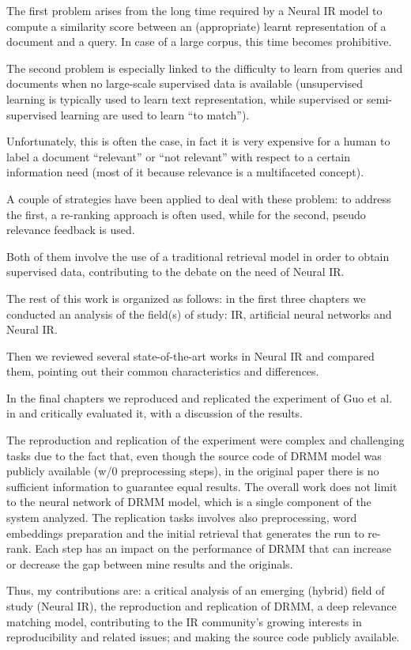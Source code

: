 The first problem arises from the long time required by a Neural IR model to compute a similarity score between an (appropriate) learnt
representation of a document and a query. In case of a large corpus, this time becomes prohibitive.

The second problem is especially linked to the difficulty to learn from queries and documents when no large-scale supervised data is available
(unsupervised learning is typically used to learn text representation, while supervised or semi-supervised learning are used to learn ``to match'').

Unfortunately, this is often the case, in fact it is very expensive for a human to label a document ``relevant'' or ``not relevant''
with respect to a certain information need (most of it because relevance is a multifaceted concept).

A couple of strategies have been applied to deal with these problem: to address the first, a re-ranking approach is often used, while for the second, pseudo relevance feedback is used.

Both of them involve the use of a traditional retrieval model in order to obtain supervised data, contributing to the debate on the need of Neural IR.

The rest of this work is organized as follows: in the first three chapters we conducted an analysis of the field(s) of study: IR, artificial neural networks and Neural IR.

Then we reviewed several state-of-the-art works in Neural IR and compared them, pointing out their common characteristics and differences.

In the final chapters we reproduced and replicated the experiment of Guo et al. in \cite{drmm} and critically evaluated it, with a discussion of the results.

The reproduction and replication of the experiment were complex and challenging tasks due to the fact that, even though the source code of DRMM model was publicly available (w/0 preprocessing steps), in the original paper there is no sufficient information to guarantee equal results. The overall work does not limit to the neural network of DRMM model, which is a single component of the system analyzed. The replication tasks involves also preprocessing, word embeddings preparation and the initial retrieval that generates the run to re-rank. Each step has an impact on the performance of DRMM that can increase or decrease the gap between mine results and the originals.

Thus, my contributions are: a critical analysis of an emerging (hybrid) field of study (Neural IR), the reproduction and replication of DRMM, a deep relevance matching model, contributing to the IR community's growing interests in reproducibility and related issues; and making the source code publicly available.
